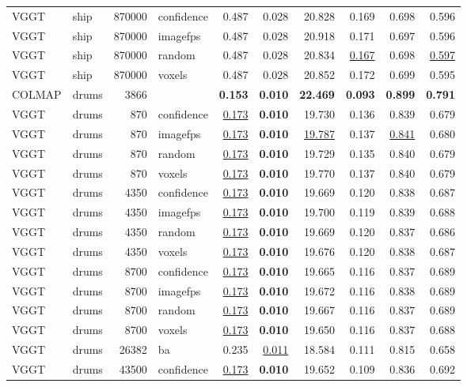 \begin{table}[H]
\begin{tabular}{llrlrrrrrr}
VGGT & ship & 870000 & confidence & 0.487 & 0.028 & 20.828 & 0.169 & 0.698 & 0.596 \\
VGGT & ship & 870000 & imagefps & 0.487 & 0.028 & 20.918 & 0.171 & 0.697 & 0.596 \\
VGGT & ship & 870000 & random & 0.487 & 0.028 & 20.834 & \underline{0.167} & 0.698 & \underline{0.597} \\
VGGT & ship & 870000 & voxels & 0.487 & 0.028 & 20.852 & 0.172 & 0.699 & 0.595 \\
\midrule
COLMAP & drums & 3866 &  & \textbf{0.153} & \textbf{0.010} & \textbf{22.469} & \textbf{0.093} & \textbf{0.899} & \textbf{0.791} \\
VGGT & drums & 870 & confidence & \underline{0.173} & \textbf{0.010} & 19.730 & 0.136 & 0.839 & 0.679 \\
VGGT & drums & 870 & imagefps & \underline{0.173} & \textbf{0.010} & \underline{19.787} & 0.137 & \underline{0.841} & 0.680 \\
VGGT & drums & 870 & random & \underline{0.173} & \textbf{0.010} & 19.729 & 0.135 & 0.840 & 0.679 \\
VGGT & drums & 870 & voxels & \underline{0.173} & \textbf{0.010} & 19.770 & 0.137 & 0.840 & 0.679 \\
VGGT & drums & 4350 & confidence & \underline{0.173} & \textbf{0.010} & 19.669 & 0.120 & 0.838 & 0.687 \\
VGGT & drums & 4350 & imagefps & \underline{0.173} & \textbf{0.010} & 19.700 & 0.119 & 0.839 & 0.688 \\
VGGT & drums & 4350 & random & \underline{0.173} & \textbf{0.010} & 19.669 & 0.120 & 0.837 & 0.686 \\
VGGT & drums & 4350 & voxels & \underline{0.173} & \textbf{0.010} & 19.676 & 0.120 & 0.838 & 0.687 \\
VGGT & drums & 8700 & confidence & \underline{0.173} & \textbf{0.010} & 19.665 & 0.116 & 0.837 & 0.689 \\
VGGT & drums & 8700 & imagefps & \underline{0.173} & \textbf{0.010} & 19.672 & 0.116 & 0.838 & 0.689 \\
VGGT & drums & 8700 & random & \underline{0.173} & \textbf{0.010} & 19.667 & 0.116 & 0.837 & 0.689 \\
VGGT & drums & 8700 & voxels & \underline{0.173} & \textbf{0.010} & 19.650 & 0.116 & 0.837 & 0.688 \\
VGGT & drums & 26382 & ba & 0.235 & \underline{0.011} & 18.584 & 0.111 & 0.815 & 0.658 \\
VGGT & drums & 43500 & confidence & \underline{0.173} & \textbf{0.010} & 19.652 & 0.109 & 0.836 & 0.692 \\

\end{tabular}
\end{table}

